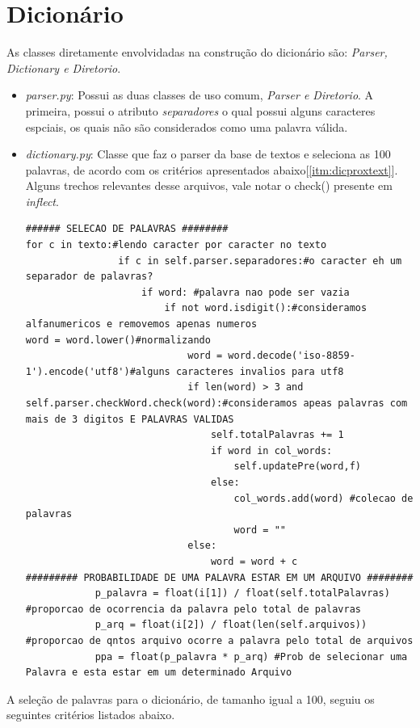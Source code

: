 \documentclass[a4paper,10pt]{article}
\begin{document}
\section{Dicionário}\label{itm:dicionario}
As classes diretamente envolvidadas na construção do dicionário são: \emph{Parser, Dictionary e Diretorio}.
\begin{itemize}
\item \label{itm:parserpy} \emph{parser.py}: Possui as duas classes de uso comum, \emph{Parser e Diretorio}. A primeira, possui o atributo \emph{separadores} o qual possui alguns caracteres espciais, os quais não são considerados como uma palavra válida. 

\item \label{itm:dictionary} \emph{dictionary.py}: Classe que faz o parser da base de textos e
seleciona as 100 palavras, de acordo com os critérios apresentados abaixo[\ref{itm:dicproxtext}]. Alguns trechos relevantes desse arquivos, vale notar o check() presente em \emph{inflect}.
\begin{lstlisting}
###### SELECAO DE PALAVRAS ########
for c in texto:#lendo caracter por caracter no texto
                if c in self.parser.separadores:#o caracter eh um separador de palavras?
                    if word: #palavra nao pode ser vazia
                        if not word.isdigit():#consideramos alfanumericos e removemos apenas numeros                             word = word.lower()#normalizando
                            word = word.decode('iso-8859-1').encode('utf8')#alguns caracteres invalios para utf8
                            if len(word) > 3 and self.parser.checkWord.check(word):#consideramos apeas palavras com mais de 3 digitos E PALAVRAS VALIDAS
                                self.totalPalavras += 1
                                if word in col_words:
                                    self.updatePre(word,f)
                                else:
                                    col_words.add(word) #colecao de palavras
                                    word = ""
                            else:
                                word = word + c
######### PROBABILIDADE DE UMA PALAVRA ESTAR EM UM ARQUIVO ########
            p_palavra = float(i[1]) / float(self.totalPalavras) #proporcao de ocorrencia da palavra pelo total de palavras
            p_arq = float(i[2]) / float(len(self.arquivos)) #proporcao de qntos arquivo ocorre a palavra pelo total de arquivos
            ppa = float(p_palavra * p_arq) #Prob de selecionar uma Palavra e esta estar em um determinado Arquivo
\end{lstlisting}
\end{itemize}
A seleção de palavras para o dicionário, de tamanho igual a 100, seguiu os seguintes critérios listados abaixo.
\end{document}

